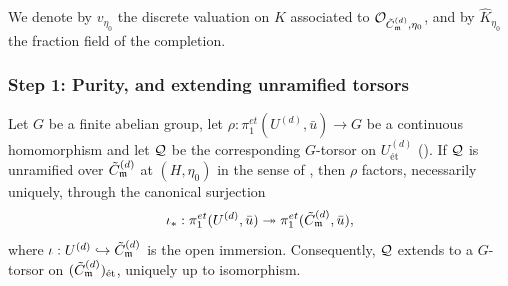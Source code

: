 We denote by $v_{\eta_0}$ the discrete valuation on $K$ associated to $\mathcal{O}_{\tilde{C}_{\mathfrak{m}}^{(d)}, \eta_0}$,
and by $\widehat{K}_{\eta_0}$ the fraction field of the completion.

\subsubsection*{Step 1: Purity, and extending unramified torsors}

\begin{prop}\label{prop:extension_via_purity}
    Let $G$ be a finite abelian group, let $\rho : \pi_1^{et}(U^{(d)}, \bar{u}) \to G$ be a continuous
    homomorphism and let $\mathcal{Q}$ be the corresponding $G$-torsor on $U^{(d)}_{\text{\'et}}$
    ().
    If $\mathcal{Q}$ is unramified over $\tilde{C}_{\mathfrak{m}}^{(d)}$ at $(H, \eta_0)$ in the sense of
    , then $\rho$ factors, necessarily uniquely, through the
    canonical surjection
    \[ \iota_* : \pi_1^{et}(U^{(d)}, \bar{u}) \twoheadrightarrow \pi_1^{et}(\tilde{C}_{\mathfrak{m}}^{(d)}, \bar{u}), \]
    where $\iota : U^{(d)} \hookrightarrow \tilde{C}_{\mathfrak{m}}^{(d)}$ is the open immersion.
    Consequently, $\mathcal{Q}$ extends to a $G$-torsor on $(\tilde{C}_{\mathfrak{m}}^{(d)})_{\text{\'et}}$, uniquely up to isomorphism.
\end{prop}
